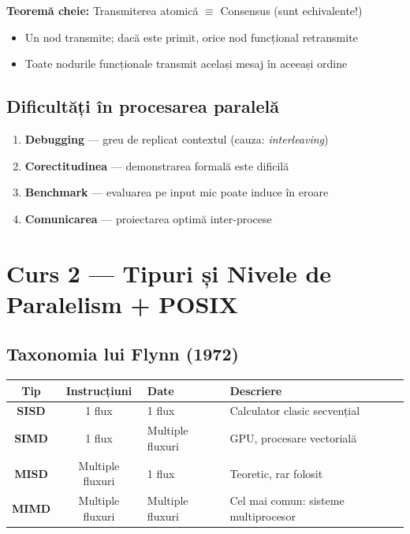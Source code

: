 \documentclass[a4paper,11pt]{article}
\newcommand{\thead}[1]{\cellcolor{tblheader}\color{white}\textbf{#1}}
\begin{document}
\begin{formulabox}
\textbf{Teoremă cheie:} Transmiterea atomică $\equiv$ Consensus (sunt echivalente!)
\begin{itemize}[noitemsep]
  \item Un nod transmite; dacă este primit, orice nod funcțional retransmite
  \item Toate nodurile funcționale transmit același mesaj în aceeași ordine
\end{itemize}
\end{formulabox}

\subsection{Dificultăți în procesarea paralelă}
\begin{enumerate}[noitemsep]
  \item \textbf{Debugging} — greu de replicat contextul (cauza: \emph{interleaving})
  \item \textbf{Corectitudinea} — demonstrarea formală este dificilă
  \item \textbf{Benchmark} — evaluarea pe input mic poate induce în eroare
  \item \textbf{Comunicarea} — proiectarea optimă inter-procese
\end{enumerate}

\section{Curs 2 — Tipuri și Nivele de Paralelism + POSIX}

\subsection{Taxonomia lui Flynn (1972)}

\begin{center}
\begin{tabular}{ccll}
\toprule
\thead{Tip} & \thead{Instrucțiuni} & \thead{Date} & \thead{Descriere} \\
\midrule
\textbf{SISD} & 1 flux & 1 flux & Calculator clasic secvențial \\
\textbf{SIMD} & 1 flux & Multiple fluxuri & GPU, procesare vectorială \\
\textbf{MISD} & Multiple fluxuri & 1 flux & Teoretic, rar folosit \\
\textbf{MIMD} & Multiple fluxuri & Multiple fluxuri & Cel mai comun: sisteme multiprocesor \\
\bottomrule
\end{tabular}
\end{center}
\end{document}
